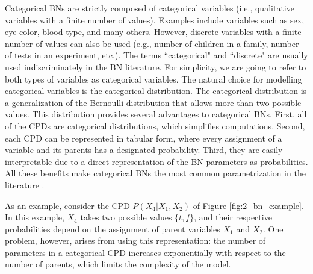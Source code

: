 Categorical BNs are strictly composed of categorical variables (i.e., qualitative variables with a finite number of values). Examples include variables such as sex, eye color, blood type, and many others. However, discrete variables with a finite number of values can also be used (e.g., number of children in a family, number of tests in an experiment, etc.). The terms ``categorical" and ``discrete" are usually used indiscriminately in the BN literature. For simplicity, we are going to refer to both types of variables as categorical variables. The natural choice for modelling categorical variables is the categorical distribution. The categorical distribution is a generalization of the Bernoulli distribution that allows more than two possible values. This distribution provides several advantages to categorical BNs. First, all of the CPDs are categorical distributions, which simplifies computations. Second, each CPD can be represented in tabular form, where every assignment of a variable and its parents has a designated probability. Third, they are easily interpretable due to a direct representation of the BN parameters as probabilities. All these benefits make categorical BNs the most common parametrization in the literature \citep{darwiche2009}. 

%


As an example, consider the CPD $P(X_{4}|X_{1}, X_{2})$ of Figure \ref{fig:2_bn_example}. In this example, $X_{4}$ takes two possible values $\{t,f\}$, and their respective probabilities depend on the assignment of parent variables $X_{1}$ and $X_{2}$. One problem, however, arises from using this representation: the number of parameters in a categorical CPD increases exponentially with respect to the number of parents, which limits the complexity of the model.




